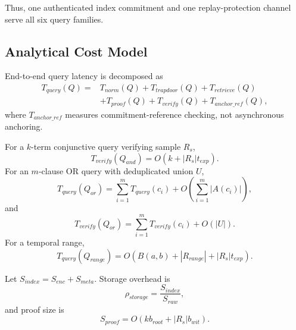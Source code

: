 \documentclass[journal]{IEEEtran}
\theoremstyle{tight}
\theoremstyle{remark}
\theoremstyle{plain}
\begin{document}
Thus, one authenticated index commitment and one replay-protection channel serve all six query families.

\subsection{Analytical Cost Model}
\label{3F}

End-to-end query latency is decomposed as
\begin{equation}
\begin{aligned}
T_{query}(Q)={}&T_{norm}(Q)+T_{trapdoor}(Q)+T_{retrieve}(Q)\\
&+T_{proof}(Q)+T_{verify}(Q)+T_{anchor\_ref}(Q),
\end{aligned}
\label{eq:tquery}
\end{equation}
where \(T_{anchor\_ref}\) measures commitment-reference checking, not asynchronous anchoring.

For a \(k\)-term conjunctive query verifying sample \(R_s\),
\begin{equation}
T_{verify}(Q_{and})=
O(k+|R_s|t_{exp}).
\label{eq:tverify-and}
\end{equation}
For an \(m\)-clause OR query with deduplicated union \(U\),
\begin{equation}
T_{query}(Q_{or})=
\sum_{i=1}^{m}T_{query}(c_i)
+O\!\left(\sum_{i=1}^{m}|A(c_i)|\right),
\label{eq:tor}
\end{equation}
and
\begin{equation}
T_{verify}(Q_{or})=
\sum_{i=1}^{m}T_{verify}(c_i)+O(|U|).
\label{eq:tverify-or}
\end{equation}
For a temporal range,
\begin{equation}
T_{query}(Q_{range})=
O\!\left(B(a,b)+|R_{range}|+|R_s|t_{exp}\right).
\label{eq:trange}
\end{equation}

Let \(S_{index}=S_{enc}+S_{meta}\). Storage overhead is
\begin{equation}
\rho_{storage}=\frac{S_{index}}{S_{raw}},
\label{eq:rho}
\end{equation}
and proof size is
\begin{equation}
S_{proof}=O(kb_{root}+|R_s|b_{wit}).
\label{eq:sproof}
\end{equation}
\end{document}

